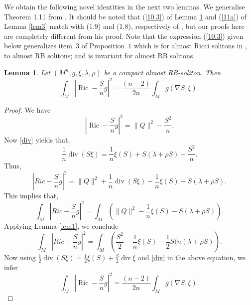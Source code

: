 \documentclass[a4paper, twoside, 10pt]{article}
\numberwithin{equation}{section}
\newtheorem{lemma}{Lemma}[section]
\theoremstyle{definition}
\begin{document}
\indent
We obtain the following novel identities in the next two lemmas. We generalise Theorem 1.11 from \cite{SDRBS}. It should be noted that (\ref{10.3}) of Lemma \ref{lem2} and (\ref{11a}) of  Lemma \ref{lem3} match with (1.9) and (1.8),
respectively of \cite{SDRBS}, but our proofs here are completely different from his proof.
 Note that the expression  (\ref{10.3}) given below generalizes item~$3$ of Proposition~$1$ which is for almost Ricci solitons in \cite{barros2013note}, to almost RB solitons;  and is invariant for almost RB solitons. \\
 
 
 
 
 


\begin{lemma}\label{lem2}
     Let $(M^n, g, \xi, \lambda,\rho)$ be a compact almost RB-soliton. Then
    \begin{equation}\label{10.3}
        \int_M\left|\operatorname{Ric}-\frac{S}{n} g\right|^{2} =  \frac{(n-2)}{2n}\int_M g(\nabla S,\xi).
    \end{equation}
\end{lemma}

\begin{proof}

    We have
    \begin{equation}\label{ricsbyn}
        \left|\operatorname{Ric}-\frac{S}{n} g\right|^{2}=\|Q\|^{2}-\frac{S^{2}}{n}.
    \end{equation}
Now \eqref{div} yields that,
$$
\frac{1}{n} \operatorname{div}(S \xi)=\frac{1}{n} \xi(S)+ S(\lambda +\rho S)-\frac{S^{2}}{n}.
$$
Thus,
$$
\left|R i c-\frac{S}{n} g\right|^{2}=\|Q\|^{2}+\frac{1}{n} \operatorname{div}(S \xi)-\frac{1}{n} \xi(S)-S(\lambda + \rho S).
$$
This implies that,
$$
\int_{M}\left|R i c-\frac{S}{n} g\right|^{2}=\int_{M}\left(\|Q\|^2-\frac{1}{n}\xi(S)-S(\lambda+\rho S)\right) .
$$
Applying Lemma \ref{lem1}, we conclude
$$
\int_{M}\left|R i c-\frac{S}{n} g\right|^{2}=\int_{M}\left(\frac{S^2}{2}-\frac{1}{n}\xi(S)-\frac{1}{2}S(n(\lambda+\rho S)\right) .
$$
Now using  $\frac{1}{2} \operatorname{div}(S \xi) = \frac{1}{2}\xi(S)+ \frac{S}{2} \operatorname{div} \xi$ and  \eqref{div} in the above equation, we infer
    \begin{equation}\label{10}
    \int_M\left|\operatorname{Ric}-\frac{S}{n} g\right|^{2}=\frac{(n-2)}{2n}\int_M g(\nabla S,\xi).
\end{equation}
\end{proof}
\end{document}

